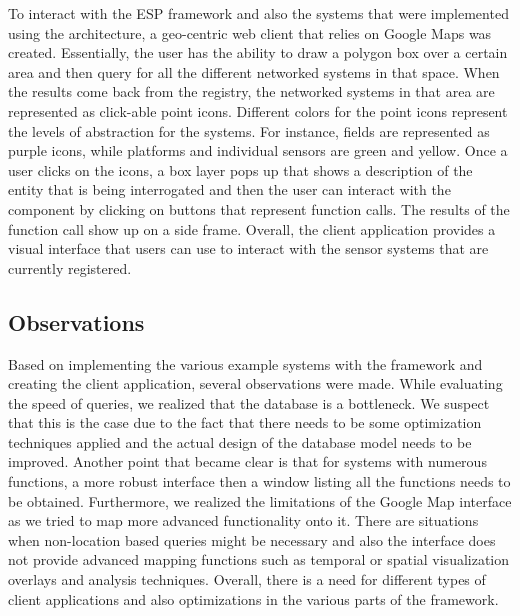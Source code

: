 To interact with the ESP framework and also the systems that were implemented using the architecture, a geo-centric web client that relies on Google Maps was created.  Essentially, the 
user has the ability to draw a polygon box over a certain area and then query for all the different networked systems in that space.  When the results come back from the registry, the networked
systems in that area are represented as click-able point icons.  Different colors for the point icons represent the levels of abstraction for the systems.  For instance, fields are
represented as purple icons, while platforms and individual sensors are green and yellow. Once a user clicks on the icons, a box layer pops up that shows a description of the
entity that is being interrogated and then the user can interact with the component by clicking on buttons that represent function calls.  The results of the function call show up on a side
frame.  Overall, the client application provides a visual interface that users can use to interact with the sensor systems that are currently registered.

\subsection{Observations}

Based on implementing the various example systems with the framework and creating the client application, several observations were made.  While evaluating the speed of queries, we realized
that the database is a bottleneck.  We suspect that this is the case due to the fact that there needs to be some optimization techniques applied and the actual design of the database model needs to be
improved.  Another point that became clear is that for systems with numerous functions, a more robust interface then a window listing all the functions needs to be obtained.  Furthermore, we 
realized the limitations of the Google Map interface as we tried to map more advanced functionality onto it.  
There are situations when non-location based queries might be necessary and also the interface does not provide advanced mapping functions
such as temporal or spatial visualization overlays and analysis techniques.  Overall, there is a need for different types of client applications and also optimizations in the various parts
of the framework.

